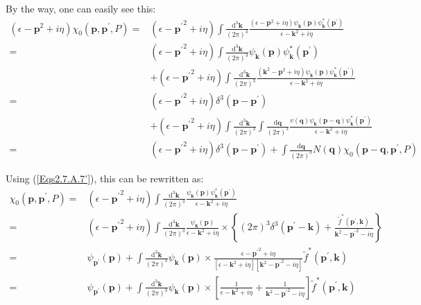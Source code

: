 By the way, one can easily see this:
\[ \begin{split}
(\epsilon-\mathbf{p}^2+i\eta)\chi_0(\mathbf{p},\mathbf{p}^{'},P) =& (\epsilon-{\mathbf{p}^{'}}^2+i\eta)\int \frac{\mathrm{d}^3 \mathbf{k}}{(2\pi)^3}\frac{(\epsilon-\mathbf{p}^2+i\eta)\psi_{\mathbf{k}}(\mathbf{p})\psi_{\mathbf{k}}^{*}(\mathbf{p}^{'})}{\epsilon-\mathbf{k}^2+i\eta}\\
=&(\epsilon-{\mathbf{p}^{'}}^2+i\eta)\int \frac{\mathrm{d}^3 \mathbf{k}}{(2\pi)^3}\psi_{\mathbf{k}}(\mathbf{p})\psi_{\mathbf{k}}^{*}(\mathbf{p}^{'})\\
&+(\epsilon-{\mathbf{p}^{'}}^2+i\eta)\int \frac{\mathrm{d}^3 \mathbf{k}}{(2\pi)^3}\frac{(\mathbf{k}^2-\mathbf{p}^2+i \eta)\psi_{\mathbf{k}}(\mathbf{p})\psi_{\mathbf{k}}^{*}(\mathbf{p}^{'})}{\epsilon-\mathbf{k}^2+i\eta}\\
=&(\epsilon-{\mathbf{p}^{'}}^2+i\eta)\delta^3(\mathbf{p}-\mathbf{p}^{'})\\
&+(\epsilon-{\mathbf{p}^{'}}^2+i\eta)\int \frac{\mathrm{d}^3 \mathbf{k}}{(2\pi)^3}\int \frac{\mathrm{d} \mathbf{q}}{(2\pi)^3} \frac{v(\mathbf{q})\psi_{\mathbf{k}}(\mathbf{p}-\mathbf{q})\psi_{\mathbf{k}}^{*}(\mathbf{p}^{'})}{\epsilon - \mathbf{k}^2+i \eta}\\
=&(\epsilon-{\mathbf{p}^{'}}^2+i\eta)\delta^3(\mathbf{p}-\mathbf{p}^{'})+\int \frac{\mathrm{d} \mathbf{q}}{(2\pi)^3} N(\mathbf{q}) \chi_0(\mathbf{p}-\mathbf{q},\mathbf{p}^{'},P)
\end{split} \]

Using (\ref{Eqs2.7.A.7'}), this can be rewritten as:
\begin{equation} \label{Eqs2.7.22} \begin{split}
\chi_0(\mathbf{p},\mathbf{p}^{'},P) =& (\epsilon-{\mathbf{p}^{'}}^2+i\eta)\int \frac{\mathrm{d}^3 \mathbf{k}}{(2\pi)^3}\frac{\psi_{\mathbf{k}}(\mathbf{p})\psi_{\mathbf{k}}^{*}(\mathbf{p}^{'})}{\epsilon-\mathbf{k}^2+i \eta}\\
=&(\epsilon-{\mathbf{p}^{'}}^2+i\eta)\int \frac{\mathrm{d}^3 \mathbf{k}}{(2\pi)^3}\frac{\psi_{\mathbf{k}}(\mathbf{p})}{\epsilon-\mathbf{k}^2+i \eta} \times \left\{ (2\pi)^3\delta^3(\mathbf{p}^{'}-\mathbf{k})+\frac{\tilde{f}^{*}(\mathbf{p}^{'},\mathbf{k})}{\mathbf{k}^2-{\mathbf{p}^{'}}^2-i \eta} \right\}\\
=&\psi_{\mathbf{p}^{'}}(\mathbf{p}) + \int \frac{\mathrm{d}^3 \mathbf{k}}{(2\pi)^3} \psi_{\mathbf{k}}(\mathbf{p}) \times \frac{\epsilon-{\mathbf{p}^{'}}^2+i \eta}{[\epsilon-\mathbf{k}^2+i \eta][\mathbf{k}^2-{\mathbf{p}^{'}}^2-i \eta]}\tilde{f}^{*}(\mathbf{p}^{'},\mathbf{k})\\
=&\psi_{\mathbf{p}^{'}}(\mathbf{p}) + \int \frac{\mathrm{d}^3 \mathbf{k}}{(2\pi)^3} \psi_{\mathbf{k}}(\mathbf{p}) \times \left[ \frac{1}{\epsilon-\mathbf{k}^2+i \eta} + \frac{1}{\mathbf{k}^2-{\mathbf{p}^{'}}^2-i \eta} \right]\tilde{f}^{*}(\mathbf{p}^{'},\mathbf{k})
\end{split} \end{equation}

